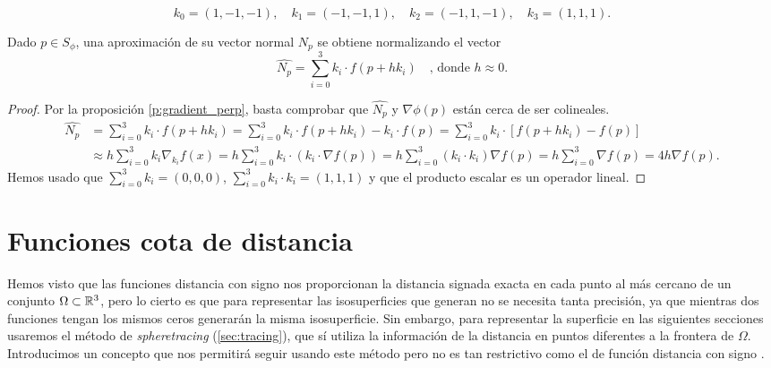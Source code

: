 \begin{equation*}
    k_0 = (1,-1,-1),\quad k_1 = (-1,-1,1),\quad k_2=(-1,1,-1),\quad k_3=(1,1,1).
\end{equation*}

\begin{proposicion}
  Dado $p\in S_\phi$, una aproximación de su vector normal $N_p$ se obtiene normalizando el vector
  \begin{equation*}
    \hat{N_p} = \sum_{i=0}^3 k_i\cdot f(p + hk_i)\quad \text{, donde } h\approx 0.
  \end{equation*}
\end{proposicion}

\begin{proof}
  Por la proposición \autoref{p:gradient_perp}, basta comprobar que $\hat{N_p}$ y $\nabla \phi(p)$ están cerca de ser colineales.
  \begin{align*}
    \hat{N_p} & = \sum_{i=0}^3 k_i\cdot f(p + hk_i) = \sum_{i=0}^3 k_i\cdot f(p + hk_i) - k_i\cdot f(p) = \sum_{i=0}^3 k_i\cdot \left[ f(p+hk_i) - f(p)\right]\\ &\approx h\sum_{i=0}^3 k_i \nabla_{k_i}f(x)
    = h\sum_{i=0}^3 k_i \cdot \left( k_i \cdot \nabla f(p)\right) = h\sum_{i=0}^3 (k_i\cdot k_i) \nabla f(p) = h\sum_{i=0}^3 \nabla f(p) = 4h\nabla f(p).
  \end{align*}
  Hemos usado que $\sum_{i=0}^3 k_i = (0,0,0)$, $\sum_{i=0}^3 k_i\cdot k_i = (1,1,1)$ y que el producto escalar es un operador lineal.
\end{proof}


\section{Funciones cota de distancia}
Hemos visto que las funciones distancia con signo nos proporcionan la distancia signada exacta en cada punto al más cercano de un conjunto $\Omega\subset \mathbb{R}^3$, pero lo cierto es que para representar las isosuperficies que generan no se necesita tanta precisión, ya que mientras dos funciones tengan los mismos ceros generarán la misma isosuperficie. Sin embargo, para representar la superficie en las siguientes secciones usaremos el método de \textit{spheretracing} (\autoref{sec:tracing}), que sí utiliza la información de la distancia en puntos diferentes a la frontera de $\Omega$. Introducimos un concepto que nos permitirá seguir usando este método pero no es tan restrictivo como el de función distancia con signo \cite{hart}.


